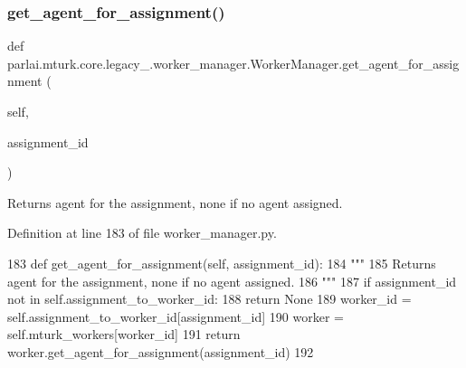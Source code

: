 \subsubsection{\texorpdfstring{get\+\_\+agent\+\_\+for\+\_\+assignment()}{get\_agent\_for\_assignment()}}
{\footnotesize\ttfamily def parlai.\+mturk.\+core.\+legacy\+\_.\+worker\+\_\+manager.\+Worker\+Manager.\+get\+\_\+agent\+\_\+for\+\_\+assignment (\begin{DoxyParamCaption}\item[{}]{self,  }\item[{}]{assignment\+\_\+id }\end{DoxyParamCaption})}

\begin{DoxyVerb}Returns agent for the assignment, none if no agent assigned.
\end{DoxyVerb}
 

Definition at line 183 of file worker\+\_\+manager.\+py.


\begin{DoxyCode}
183     \textcolor{keyword}{def }get\_agent\_for\_assignment(self, assignment\_id):
184         \textcolor{stringliteral}{"""}
185 \textcolor{stringliteral}{        Returns agent for the assignment, none if no agent assigned.}
186 \textcolor{stringliteral}{        """}
187         \textcolor{keywordflow}{if} assignment\_id \textcolor{keywordflow}{not} \textcolor{keywordflow}{in} self.assignment\_to\_worker\_id:
188             \textcolor{keywordflow}{return} \textcolor{keywordtype}{None}
189         worker\_id = self.assignment\_to\_worker\_id[assignment\_id]
190         worker = self.mturk\_workers[worker\_id]
191         \textcolor{keywordflow}{return} worker.get\_agent\_for\_assignment(assignment\_id)
192 
\end{DoxyCode}
\mbox{\label{classparlai_1_1mturk_1_1core_1_1legacy__2018_1_1worker__manager_1_1WorkerManager_af760454741dd152b5cf325cbdaff4d3f}} 
